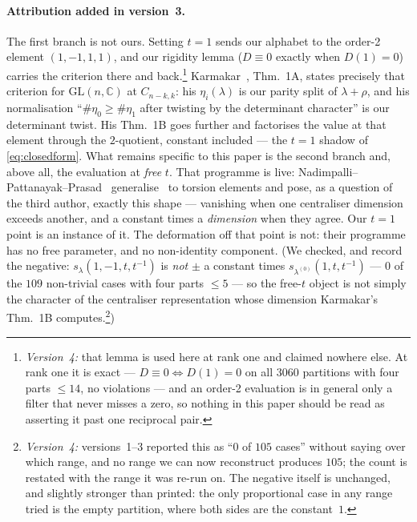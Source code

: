 \documentclass[11pt,a4paper]{article}
\begin{document}
\paragraph{Attribution added in version~3.}
The first branch is not ours. Setting $t=1$ sends our
alphabet to the order-2 element $(1,-1,1,1)$, and our rigidity lemma ($D\equiv0$ exactly when
$D(1)=0$) carries the criterion there and back.\footnote{\emph{Version~4:} that lemma is used here
at rank one and claimed nowhere else. At rank one it is exact --- $D\equiv0\iff D(1)=0$ on all
$3060$ partitions with four parts $\le14$, no violations --- and an order-2 evaluation is in
general only a filter that never misses a zero, so nothing in this paper should be read as
asserting it past one reciprocal pair.} Karmakar~\cite{Karmakar}, Thm.~1A, states precisely
that criterion for $\mathrm{GL}(n,\mathbb{C})$ at $C_{n-k,k}$: his $\eta_i(\lambda)$ is our parity
split of $\lambda+\rho$, and his normalisation ``$\#\eta_0\ge\#\eta_1$ after twisting by the
determinant character'' is our determinant twist. His Thm.~1B goes further and factorises the value
at that element through the $2$-quotient, constant included --- the $t=1$ shadow of
\eqref{eq:closedform}. What remains specific to this paper is the second branch and, above all, the
evaluation at \emph{free} $t$. That programme is live: Nadimpalli--Pattanayak--Prasad~\cite{NPP}
generalise~\cite{Karmakar} to torsion elements and pose, as a question of the third author, exactly
this shape --- vanishing when one centraliser dimension exceeds another, and a constant times a
\emph{dimension} when they agree. Our $t=1$ point is an instance of it. The deformation off that
point is not: their programme has no free parameter, and no non-identity component. (We checked, and
record the negative: $s_\lambda(1,-1,t,t^{-1})$ is \emph{not} $\pm$ a constant times
$s_{\lambda^{(0)}}(1,t,t^{-1})$ --- $0$ of the $109$ non-trivial cases with four parts $\le5$ ---
so the free-$t$ object is not simply the
character of the centraliser representation whose dimension Karmakar's Thm.~1B
computes.\footnote{\emph{Version~4:} versions~1--3 reported this as ``$0$ of $105$ cases'' without
saying over which range, and no range we can now reconstruct produces $105$; the count is restated
with the range it was re-run on. The negative itself is unchanged, and slightly stronger than
printed: the only proportional case in any range tried is the empty partition, where both sides are
the constant~$1$.})
\end{document}
